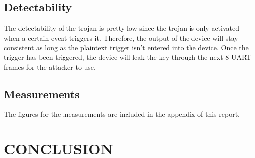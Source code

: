 \documentclass[letterpaper, 10 pt, conference]{ieeeconf}  %
\begin{document}
\subsection{Detectability}

The detectability of the trojan is pretty low since the trojan is only activated when a certain event triggers it. Therefore, the output of the device will stay consistent as long as the plaintext trigger isn't entered into the device. Once the trigger has been triggered, the device will leak the key through the next 8 UART frames for the attacker to use.

\subsection{Measurements} 



The figures for the measurements are included in the appendix of this report.

\section{CONCLUSION}


\addtolength{\textheight}{-12cm}   %









\end{document}
